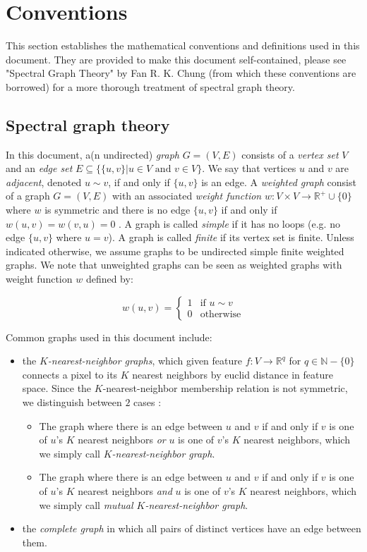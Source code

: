 \section{Conventions}
\label{sec:conventions}

This section establishes the mathematical conventions and definitions used in this document. They are provided to make this document self-contained, please see "Spectral Graph Theory" by Fan R. K. Chung \cite{chung1997spectral} (from which these conventions are borrowed) for a more thorough treatment of spectral graph theory.

\subsection{Spectral graph theory}
In this document, a(n undirected) \emph{graph} $G = (V, E)$ consists of a \emph{vertex set} $V$ and an \emph{edge set} $E \subseteq \{\{u, v\} | u \in V \text{ and } v \in V\}$. We say that vertices $u$ and $v$ are \emph{adjacent}, denoted $u \sim v$, if and only if $\{u,v\}$ is an edge. A \emph{weighted graph} consist of a graph $G = (V, E)$ with an associated \emph{weight function} $w : V \times V \rightarrow \mathbb{R}^+ \cup \{0\}$ where $w$ is symmetric and there is no edge $\{u,v\}$ if and only if $w(u,v) = w(v,u) = 0$ . A graph is called \emph{simple} if it has no loops (e.g. no edge $\{u, v\}$ where $u = v$). A graph is called \emph{finite} if its vertex set is finite. Unless indicated otherwise, we assume graphs to be undirected simple finite weighted graphs. We note that unweighted graphs can be seen as weighted graphs with weight function $w$ defined by:

\[
w(u,v) = \begin{cases}
1 & \text{if }u \sim v \\
0 & \text{otherwise}
\end{cases}
\]

Common graphs used in this document include:
\begin{itemize}
\item the \emph{$K$-nearest-neighbor graphs}, which given feature $f  : V \rightarrow \mathbb{R}^q$ for $q \in \mathbb{N} - \{0\}$ connects a pixel to its $K$ nearest neighbors by euclid distance in feature space. Since the $K$-nearest-neighbor membership relation is not symmetric, we distinguish between $2$ cases \cite{von2007tutorial}:
\begin{itemize}
\item The graph where there is an edge between $u$ and $v$ if  and only if $v$ is one of $u$'s $K$ nearest neighbors \emph{or} $u$ is one of $v$'s $K$ nearest neighbors, which we simply call \emph{$K$-nearest-neighbor graph}.
\item The graph where there is an edge between $u$ and $v$ if and only if $v$ is one of $u$'s $K$ nearest neighbors \emph{and} $u$ is one of $v$'s $K$ nearest neighbors, which we simply call \emph{mutual $K$-nearest-neighbor graph}.
\end{itemize}
\item the \emph{complete graph} in which all pairs of distinct vertices have an edge between them.
\end{itemize}

